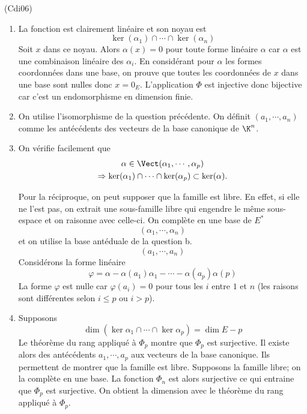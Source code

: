 \begin{tiny}(Cdi06)\end{tiny} \label{exo: di06}
\begin{enumerate}
  \item La fonction est clairement linéaire et son noyau est
\begin{displaymath}
  \ker(\alpha_1) \cap \cdots \cap \ker(\alpha_n)
\end{displaymath}
Soit $x$ dans ce noyau. Alors $\alpha(x)=0$ pour toute forme linéaire $\alpha$ car $\alpha$ est une combinaison linéaire des $\alpha_i$. En considérant pour $\alpha$ les formes coordonnées dans une base, on prouve que toutes les coordonnées de $x$ dans une base sont nulles donc $x=0_E$. L'application $\Phi$ est injective donc bijective car c'est un endomorphisme en dimension finie.

  \item On utilise l'isomorphisme de la question précédente. On définit $(a_1,\cdots,a_n)$ comme les antécédents des vecteurs de la base canonique de $\K^n$. 
  
  \item On vérifie facilement que
\begin{multline*}
  \alpha \in \Vect(\alpha_1,\cdots, \alpha_p) \\
  \Rightarrow \ker(\alpha_1) \cap \cdots \cap \ker(\alpha_p) \subset \ker(\alpha).
\end{multline*}

Pour la réciproque, on peut supposer que la famille est libre. En effet, si elle ne l'est pas, on extrait une sous-famille libre qui engendre le même sous-espace et on raisonne avec celle-ci.\newline
On complète en une base de $E^*$
\begin{displaymath}
  (\alpha_1,\cdots, \alpha_n)
\end{displaymath}
et on utilise la base antéduale de la question b.
\begin{displaymath}
  (a_1,\cdots, a_n)
\end{displaymath}
Considérons la forme linéaire
\begin{displaymath}
  \varphi = \alpha - \alpha(a_1)\alpha_1 - \cdots - \alpha(a_p)\alpha(p)
\end{displaymath}
La forme $\varphi$ est nulle car $\varphi(a_i)=0$ pour tous les $i$ entre $1$ et $n$ (les raisons sont différentes selon $i\leq p$ ou $i>p$). 

  \item Supposons
\begin{displaymath}
  \dim(\ker \alpha_1\cap\cdots\cap\ker\alpha_p) = \dim E -p
\end{displaymath}
Le théorème du rang appliqué à $\Phi_p$ montre que $\Phi_p$ est surjective. Il existe alors des antécédents $a_1,\cdots,a_p$ aux vecteurs de la base canonique. Ils permettent de montrer que la famille est libre.\newline
Supposons la famille libre; on la complète en une base. La fonction $\Phi_n$ est alors surjective ce qui entraine que $\Phi_p$ est surjective. On obtient la dimension avec le théorème du rang appliqué à $\Phi_p$.
\end{enumerate}
